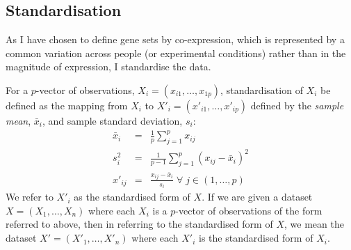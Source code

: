 \documentclass[12pt]{article} %
\begin{document}
	
	
	

	
	\subsection{Standardisation} \label{sec:standardisation}
	As I have chosen to define gene sets by co-expression, which is represented by a common variation across people (or experimental conditions) rather than in the magnitude of expression, I standardise the data.
	
	For a $p$-vector of observations, $X_i=(x_{i1},\ldots,x_{1p})$, standardisation of $X_i$ be defined as the mapping from $X_i$ to $X'_i=(x'_{i1},\ldots,x'_{ip})$ defined by the \emph{sample mean}, $\bar{x}_i$, and sample standard deviation, $s_i$:
	\begin{eqnarray} \label{eqn:standardisation}
	\bar{x}_i &=& \frac{1}{p}\sum_{j=1}^p x_{ij} \\
	s_i^2 &=& \frac{1}{p - 1}\sum_{j=1}^p \left( x_{ij} - \bar{x}_i \right) ^2 \\
	x'_{ij} &=& \frac{x_{ij}- \bar{x}_i}{s_i} \; \forall \; j \in (1,\ldots,p)
	\end{eqnarray}
	We refer to $X'_i$ as the standardised form of $X$. If we are given a dataset $X=(X_1,\ldots,X_n)$ where each $X_i$ is a $p$-vector of observations of the form referred to above, then in referring to the standardised form of $X$, we mean the dataset $X'=(X'_1,\ldots,X'_n)$ where each $X'_i$ is the standardised form of $X_i$.
	
\end{document}
